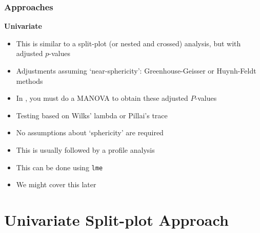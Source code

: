 \documentclass[color=usenames,dvipsnames]{beamer}\usepackage[]{graphicx}\usepackage[]{color}
\newcommand{\inr}[1]{\colorbox{inlinecolor}{\texttt{#1}}}
\begin{document}
\begin{frame}[fragile]
   \frametitle{Approaches}
      {\bf Univariate}
        \begin{itemize}
        \normalsize
          \item<1-> This is similar to a split-plot (or nested and crossed) analysis, but with adjusted $p$-values 
          \item<1-> Adjustments assuming `near-sphericity': Greenhouse-Geisser or Huynh-Feldt methods
          \item<1-> In \R, you must do a MANOVA to obtain these adjusted $P$-values
        \end{itemize}
      \vfill
        \begin{itemize}
          \item<2-> Testing based on Wilks' lambda or Pillai's trace %
          \item<2-> No assumptions about `sphericity' are required
          \item<2-> This is usually followed by a profile analysis
        \end{itemize}
      \vfill
        \begin{itemize}
        \item<3-> This can be done using \inr{lme}
        \item<3-> We might cover this later%
      \end{itemize}
\end{frame}







\section{Univariate Split-plot Approach}
\end{document}

